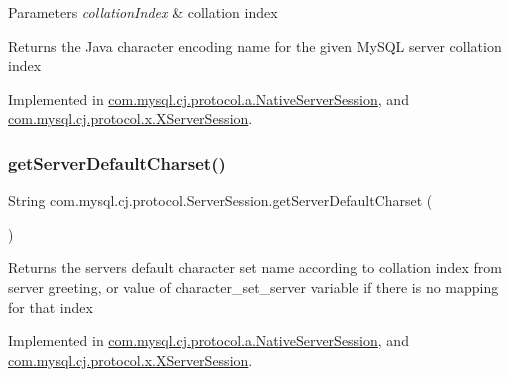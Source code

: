 \begin{DoxyParams}{Parameters}
{\em collation\+Index} & collation index \\
\hline
\end{DoxyParams}
\begin{DoxyReturn}{Returns}
the Java character encoding name for the given My\+S\+QL server collation index 
\end{DoxyReturn}


Implemented in \mbox{\hyperlink{classcom_1_1mysql_1_1cj_1_1protocol_1_1a_1_1_native_server_session_a3a9d807f5e66892f234d06934d275de1}{com.\+mysql.\+cj.\+protocol.\+a.\+Native\+Server\+Session}}, and \mbox{\hyperlink{classcom_1_1mysql_1_1cj_1_1protocol_1_1x_1_1_x_server_session_a3184e5a4acad8af656fb72a6b57a5fa8}{com.\+mysql.\+cj.\+protocol.\+x.\+X\+Server\+Session}}.

\mbox{\label{interfacecom_1_1mysql_1_1cj_1_1protocol_1_1_server_session_afeb928036af67a7fff2d45783673c72d}} 
\subsubsection{\texorpdfstring{get\+Server\+Default\+Charset()}{getServerDefaultCharset()}}
{\footnotesize\ttfamily String com.\+mysql.\+cj.\+protocol.\+Server\+Session.\+get\+Server\+Default\+Charset (\begin{DoxyParamCaption}{ }\end{DoxyParamCaption})}

\begin{DoxyReturn}{Returns}
the server\textquotesingle{}s default character set name according to collation index from server greeting, or value of \textquotesingle{}character\+\_\+set\+\_\+server\textquotesingle{} variable if there is no mapping for that index 
\end{DoxyReturn}


Implemented in \mbox{\hyperlink{classcom_1_1mysql_1_1cj_1_1protocol_1_1a_1_1_native_server_session_ad663008943ab8a1188490e3ba0befe95}{com.\+mysql.\+cj.\+protocol.\+a.\+Native\+Server\+Session}}, and \mbox{\hyperlink{classcom_1_1mysql_1_1cj_1_1protocol_1_1x_1_1_x_server_session_a7258b06a9876fde6f4ca0726a8fff500}{com.\+mysql.\+cj.\+protocol.\+x.\+X\+Server\+Session}}.

